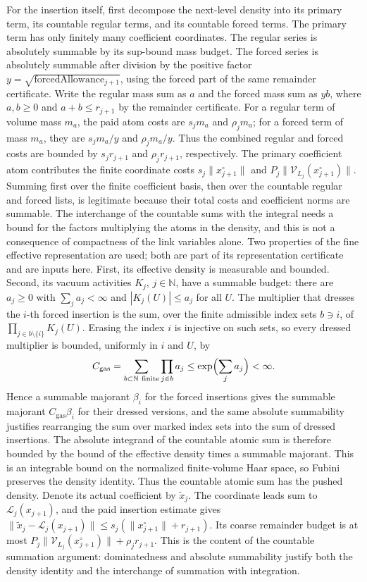For the insertion itself, first decompose the next-level density into its
primary term, its countable regular terms, and its countable forced terms.
The primary term has only finitely many coefficient coordinates.
The regular series is absolutely summable by its sup-bound mass budget. The
forced series is absolutely summable after division by the positive factor
\(y=\sqrt{\operatorname{forcedAllowance}_{j+1}}\), using the forced part
of the same remainder certificate. Write the regular mass sum as \(a\) and the forced mass sum as \(yb\),
where \(a,b\geq0\) and \(a+b\leq r_{j+1}\) by the remainder
certificate. For a regular term of volume mass \(m_a\), the paid atom
costs are \(s_jm_a\) and \(\rho_jm_a\); for a forced term of mass
\(m_a\), they are \(s_jm_a/y\) and \(\rho_jm_a/y\). Thus the
combined regular and forced costs are bounded by \(s_jr_{j+1}\) and
\(\rho_jr_{j+1}\), respectively. The primary coefficient atom contributes the finite
coordinate costs \(s_j\|x_{j+1}^{\circ}\|\) and
\(P_j\|\mathcal V_{L_j}(x_{j+1}^{\circ})\|\). Summing first over the
finite coefficient basis, then over the countable regular and forced lists,
is legitimate because their total costs and coefficient norms are summable.
The interchange of the countable sums with the integral needs a bound
for the factors multiplying the atoms in the density, and this is not a
consequence of compactness of the link variables alone. Two properties of
the fine effective representation are used; both are part of its
representation certificate and are inputs here. First, its effective
density is measurable and bounded. Second, its vacuum activities \(K_j\),
\(j\in\mathbb N\), have a summable budget: there are \(a_j\geq0\) with
\(\sum_ja_j<\infty\) and \(|K_j(U)|\leq a_j\) for all \(U\). The multiplier
that dresses the \(i\)-th forced insertion is the sum, over the finite
admissible index sets \(b\ni i\), of \(\prod_{j\in b\setminus\{i\}}K_j(U)\).
Erasing the index \(i\) is injective on such sets, so every dressed
multiplier is bounded, uniformly in \(i\) and \(U\), by
\[
 C_{\mathrm{gas}}=\sum_{b\subset\mathbb N\ \mathrm{finite}}
     \prod_{j\in b}a_j\leq\exp\Bigl(\sum_ja_j\Bigr)<\infty.
\]
Hence a summable majorant \(\beta_i\) for the forced insertions gives the
summable majorant \(C_{\mathrm{gas}}\beta_i\) for their dressed versions,
and the same absolute summability justifies rearranging the sum over
marked index sets into the sum of dressed insertions. The absolute
integrand of the countable atomic
sum is therefore bounded by the bound of the effective density times a
summable majorant. This is
an integrable bound on the normalized finite-volume Haar space, so Fubini
preserves the density identity.
Thus the countable atomic sum has the pushed density. Denote its actual
coefficient by \(\widetilde x_j\). The coordinate leads sum to
\(\mathcal L_j(x_{j+1})\), and the paid insertion estimate gives
\(\|\widetilde x_j-\mathcal L_j(x_{j+1})\|\leq
s_j(\|x_{j+1}^{\circ}\|+r_{j+1})\). Its coarse remainder budget is at
most \(P_j\|\mathcal V_{L_j}(x_{j+1}^{\circ})\|+\rho_jr_{j+1}\).
This is the content of the countable summation argument: dominatedness and
absolute summability justify both the density identity and the interchange
of summation with integration.

